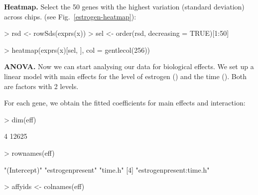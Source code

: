 \documentclass[a4paper]{article}
\begin{document}
\begin{exercises}
\item {\bf Heatmap.}  
Select the 50 genes with the highest variation (standard deviation) 
across chips. (see Fig.~\ref{estrogen-heatmap}):

\begin{Schunk}
\begin{Sinput}
> rsd <- rowSds(exprs(x))
> sel <- order(rsd, decreasing = TRUE)[1:50]
\end{Sinput}
\end{Schunk}
\begin{Schunk}
\begin{Sinput}
> heatmap(exprs(x)[sel, ], col = gentlecol(256))
\end{Sinput}
\end{Schunk}

\item {\bf ANOVA.}  
Now we can start analysing our data for biological effects.
We set up a linear model with main effects for the level of estrogen  
() and the time (). Both are factors with 
2 levels.

\begin{Schunk}
\end{Schunk}


For each gene, we obtain the fitted coefficients for main effects and 
interaction:
\begin{Schunk}
\begin{Sinput}
> dim(eff)
\end{Sinput}
\begin{Soutput}
[1]     4 12625
\end{Soutput}
\begin{Sinput}
> rownames(eff)
\end{Sinput}
\begin{Soutput}
[1] "(Intercept)"            "estrogenpresent"        "time.h"                
[4] "estrogenpresent:time.h"
\end{Soutput}
\begin{Sinput}
> affyids <- colnames(eff)
\end{Sinput}
\end{Schunk}


\end{exercises}
\end{document}
